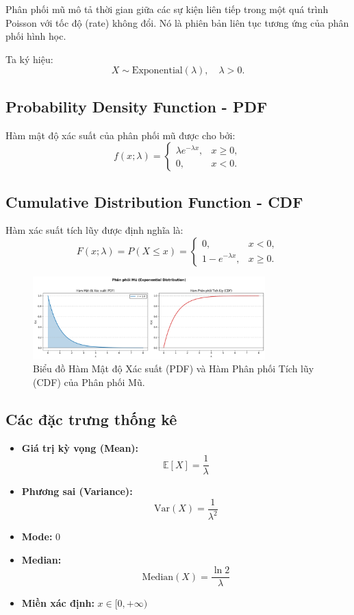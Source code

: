 Phân phối mũ mô tả thời gian giữa các sự kiện liên tiếp trong một quá trình Poisson với tốc độ (rate) không đổi.  
Nó là phiên bản liên tục tương ứng của phân phối hình học.  

Ta ký hiệu:
\[
X \sim \mathrm{Exponential}(\lambda), \quad \lambda>0.
\]

\subsection{Probability Density Function - PDF}

Hàm mật độ xác suất của phân phối mũ được cho bởi:
\[
f(x;\lambda) = 
\begin{cases}
\lambda e^{-\lambda x}, & x \ge 0, \\
0, & x < 0.
\end{cases}
\]

\subsection{Cumulative Distribution Function - CDF}

Hàm xác suất tích lũy được định nghĩa là:
\[
F(x;\lambda) = P(X \le x) =
\begin{cases}
0, & x < 0,\\[0.5em]
1 - e^{-\lambda x}, & x \ge 0.
\end{cases}
\]

\begin{figure}[h!]
 \centering
 \includegraphics[width=0.8\textwidth]{images/Exp_PDF_and_CDF.png}
\caption{Biểu đồ Hàm Mật độ Xác suất (PDF) và Hàm Phân phối Tích lũy (CDF) của Phân phối Mũ.}
\label{fig:exponential_dist}
\end{figure}

\subsection{Các đặc trưng thống kê}

\begin{itemize}
    \item \textbf{Giá trị kỳ vọng (Mean):}
    \[
    \mathbb{E}[X] = \frac{1}{\lambda}
    \]
    \item \textbf{Phương sai (Variance):}
    \[
    \mathrm{Var}(X) = \frac{1}{\lambda^2}
    \]
    \item \textbf{Mode:} $0$
    \item \textbf{Median:}
    \[
    \mathrm{Median}(X) = \frac{\ln 2}{\lambda}
    \]
    \item \textbf{Miền xác định:} $x \in [0, +\infty)$
\end{itemize}

